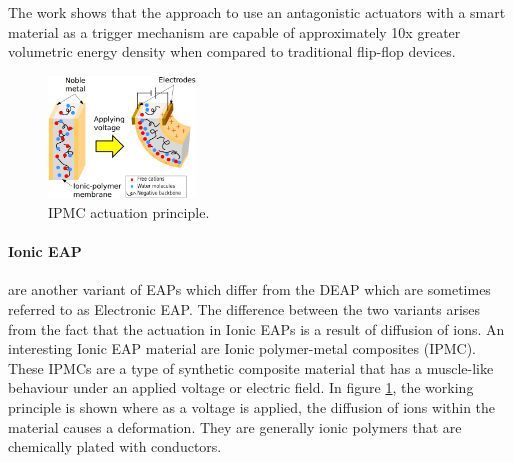 The work shows that the approach to use an antagonistic actuators with a smart material as a trigger mechanism are capable of approximately 10x greater volumetric energy density when compared to traditional flip-flop devices.

\begin{figure}
	\centering
	\vspace{-20pt}
	\includegraphics[width=0.35\textwidth]{Figures/IPMC_fig.eps}
	\caption{IPMC actuation principle\cite{poubel_proposal_2011}.}
	\vspace{-5pt}
	\label{fig:IPMC_act}
\end{figure}
\paragraph{Ionic EAP} are another variant of EAPs which differ from the DEAP which are sometimes referred to as Electronic EAP\cite{bar-cohen_artificial_2005}. The difference between the two variants arises from the fact that the actuation in Ionic EAPs is a result of diffusion of ions. An interesting Ionic EAP material are Ionic polymer-metal composites (IPMC). These IPMCs are a type of synthetic composite material that has a muscle-like behaviour under an applied voltage or electric field. In figure \ref{fig:IPMC_act}, the working principle is shown where as a voltage is applied, the diffusion of ions within the material causes a deformation. They are generally ionic polymers that are chemically plated with conductors\cite{shahinpoor_ionic_1998}.

